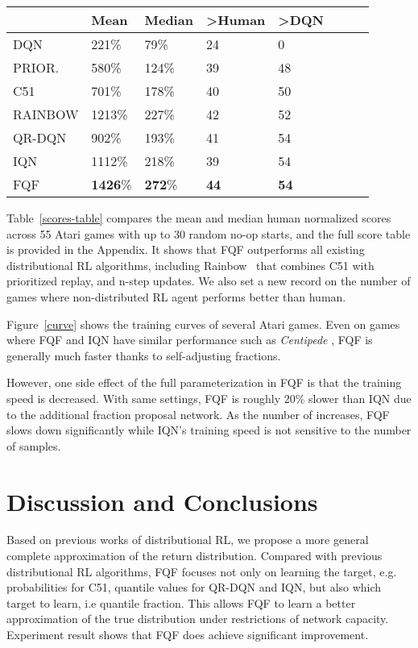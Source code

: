 \documentclass{article}
\begin{document}
\begin{table*}[ht!]
	\centering
    \begin{tabular}{llllllll}
		\hline \hline
		& Mean & Median & >Human & >DQN \\
		\midrule
		DQN & 221\% & 79\% & 24 & 0 \\
		PRIOR. & 580\% & 124\% & 39 & 48 \\
		C51 & 701\% & 178\% & 40 & 50 \\
		RAINBOW & 1213\% & 227\% & 42 & 52\\
		QR-DQN & 902\% & 193\% & 41 & 54\\
		IQN & 1112\% & 218\%  & 39 & 54 \\
		\bottomrule
		FQF & \textbf{1426}\% & \textbf{272}\%  & \textbf{44} & \textbf{54}
	\end{tabular}
\caption{Mean and median scores across 55 Atari 2600 games, measured as percentages of human baseline. Scores are averages over 3 seeds.} \label{scores-table}
\end{table*}

Table~\ref{scores-table} compares the mean and median human normalized scores across 55 Atari games with up to 30 random no-op starts, and the full score table is provided in the Appendix. It shows that FQF outperforms all existing distributional RL algorithms, including Rainbow~\citep{hessel2018rainbow} that combines C51 with prioritized replay, and n-step updates. We also set a new record on the number of games where non-distributed RL agent performs better than human. 

Figure~\ref{curve} shows the training curves of several Atari games. Even on games where FQF and IQN have similar performance such as \textit{Centipede} , FQF is generally much faster thanks to self-adjusting fractions. 

However, one side effect of the full parameterization in FQF is that the training speed is decreased. With same settings, FQF is roughly 20\% slower than IQN due to the additional fraction proposal network. As the number of  increases, FQF slows down significantly while IQN's training speed is not sensitive to the number of  samples.

\section{Discussion and Conclusions}
Based on previous works of distributional RL, we propose a more general complete approximation of the return distribution. Compared with previous distributional RL algorithms, FQF focuses not only on learning the target, e.g. probabilities for C51, quantile values for QR-DQN and IQN, but also which target to learn, i.e quantile fraction. This allows FQF to learn a better approximation of the true distribution under restrictions of network capacity. Experiment result shows that FQF does achieve significant improvement.
\end{document}
